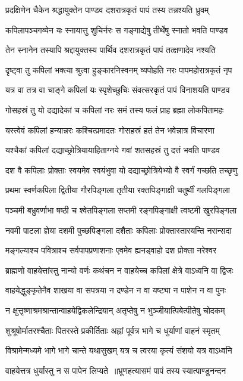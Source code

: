 \twolineshloka
{प्रदक्षिणेन चैकेन श्रद्धायुक्तेन पाण्डव}
{दशरात्रकृतं पापं तस्य तन्नश्यति ध्रुवम्}


\twolineshloka
{कपिलापञ्चगव्येन यः स्नायात्तु शुचिर्नरः}
{स गङ्गाद्येषु तीर्थेषु स्नातो भवति पाण्डव}


\twolineshloka
{तेन स्नानेन तस्यापि श्रद्दायुक्तस्य पार्थिव}
{दशरात्रकृतं पापं तत्क्षणादेव नश्यति}


\twolineshloka
{दृष्ट्वा तु कपिलां भक्त्या श्रुत्वा हुङ्कारनिस्वनम्}
{व्यपोहति नरः पापमहोरात्रकृतं नृप}


\twolineshloka
{यत्र वा तत्र वा चाङ्गे कपिलां यः स्पृशेच्छुचिः}
{संवत्सरकृतं पापं विनाशयति पाण्डव}


\twolineshloka
{गोसहस्रं तु यो दद्यादेकां च कपिलां नरः}
{समं तस्य फलं प्राह ब्रह्मा लोकपितामहः}


\twolineshloka
{यस्त्वेवं कपिलां हन्यान्नरः कश्चित्प्रमादतः}
{गोसहस्रं हतं तेन भवेन्नात्र विचारणा}


\twolineshloka
{यश्चैकां कपिलां दद्याच्छ्रोत्रियायाहिताग्नये}
{गवां शतसहस्रं तु दत्तं भवति पाण्डव}


\twolineshloka
{दश वै कपिलाः प्रोक्ताः स्वयमेव स्वयंभुवा}
{यो दद्याच्छ्रोत्रियेभ्यो वै स्वर्गं गच्छति तच्छृणु}


\twolineshloka
{प्रथमा स्वर्णकपिला द्वितीया गौरपिङ्गला}
{तृतीया रक्तपिङ्गाक्षी चतुर्थीं गलपिङ्गला}


\twolineshloka
{पञ्चमी बभ्रुवर्णाभा षष्ठी च श्वेतपिङ्गला}
{सप्तमी रङ्गपिङ्गाक्षी त्वष्टमी खुरपिङ्गला}


\twolineshloka
{नवमी पाटला ज्ञेया दशमी पुच्छपिङ्गला}
{दशैताः कपिलाः प्रोक्तास्तारयन्ति नरान्सदा}


\twolineshloka
{मङ्गल्याश्च पवित्राश्च सर्वपापप्रणाशनाः}
{एवमेव ह्यनड्वाहो दश प्रोक्ता नरेश्वर}


\twolineshloka
{ब्राह्मणो वाहयेत्तांस्तु नान्यो वर्णः कथंचन}
{न वाहयेच्च कपिलां क्षेत्रे वाऽध्वनि वा द्विजः}


\twolineshloka
{वाहयेद्धुङ्कृतेनैव शाखया वा सपत्रया}
{न दण्डेन न वा यष्ट्या न पाशेन न वा पुनः}


\twolineshloka
{न क्षुत्तृष्णाश्रमश्रान्तान्वाहयेद्विकलेन्द्रियान्}
{अतृप्तेषु न भुञ्जीयात्पिबेत्पीतेषु चोदकम्}


\twolineshloka
{शुश्रूषोर्मातरश्चैताः पितरस्ते प्रकीर्तिताः}
{अह्नां पूर्वत्र भागे च धुर्याणां वाहनं स्मृतम्}


\threelineshloka
{विश्रामेन्मध्यमे भागे भागे चान्ते यथासुखम्}
{यत्र च त्वरया कृत्यं संशयो यत्र वाऽध्वनि}
{}


\twolineshloka
{वाहयेत्तत्र धुर्यांस्तु न स पापेन लिप्यते ॥भ्रूणहत्यासमं पापं तस्य स्यात्पाण्डुनन्दन}
{}


